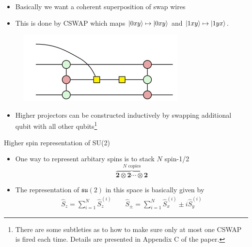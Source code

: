 \documentclass[aspectratio=169,xcolor=dvipsnames, t]{beamer}
\begin{document}
\begin{frame}
    \begin{itemize}
        \item Basically we want a coherent superposition of swap wires
        \item This is done by CSWAP which maps $\ket{0xy}\mapsto\ket{0xy}$ and $\ket{1xy}\mapsto\ket{1yx}$.
    \end{itemize}
    \begin{figure}
        \includegraphics[width=.6\textwidth]{figures/cswap_two_qbit.png}
    \end{figure}
    \begin{itemize}
        \item Higher projectors can be constructed inductively by swapping additional qubit with all other qubits\footnote{There are some subtleties as to how to make sure only at most one CSWAP is fired each time. Details are presented in Appendix C of the paper.}
    \end{itemize}
    
\end{frame}


\begin{frame}{Higher spin representation of SU(2)}
    \begin{itemize}
        \item One way to represent arbitary spins is to stack $N$ spin-1/2 
        $$\overbrace{\mathbf{2} \otimes  \mathbf{2} \cdots \otimes \mathbf{2}}^{N \text{ copies}}$$
        \item The representation of $\mathfrak{su}(2)$ in this space is basically given by
        \begin{align*}
            \hat S_z = \sum_{i=1}^N \hat S_z^{(i)}\quad\quad 
            \hat S_\pm = \sum_{i=1}^{N}\hat S_x^{(i)}\pm i \hat S_y^{(i)}
        \end{align*}
    \end{itemize}
\end{frame}
\end{document}
